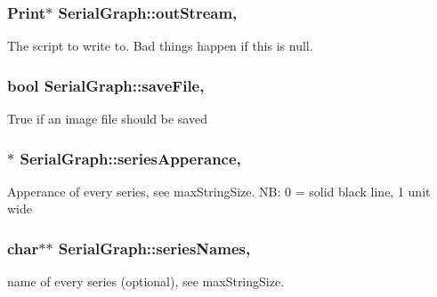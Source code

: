 \subsubsection[{out\+Stream}]{\setlength{\rightskip}{0pt plus 5cm}Print$\ast$ Serial\+Graph\+::out\+Stream\hspace{0.3cm}{\ttfamily [protected]}, {\ttfamily [inherited]}}\label{class_serial_graph_aec32289a9393e98bf80d44406e5c207d}
The script to write to. Bad things happen if this is null. \hypertarget{class_serial_graph_a24202e0a7a8bac5ec1cfd92bf796e078}{}
\subsubsection[{save\+File}]{\setlength{\rightskip}{0pt plus 5cm}bool Serial\+Graph\+::save\+File\hspace{0.3cm}{\ttfamily [protected]}, {\ttfamily [inherited]}}\label{class_serial_graph_a24202e0a7a8bac5ec1cfd92bf796e078}
True if an image file should be saved \hypertarget{class_serial_graph_a8d743f9eeeca69a988d2159a405e4253}{}
\subsubsection[{series\+Apperance}]{$\ast$ Serial\+Graph\+::series\+Apperance\hspace{0.3cm}{\ttfamily [protected]}, {\ttfamily [inherited]}}\label{class_serial_graph_a8d743f9eeeca69a988d2159a405e4253}
Apperance of every series, see max\+String\+Size. N\+B\+: 0 = solid black line, 1 unit wide \hypertarget{class_serial_graph_a2307e40e27249f44bbe14776dc68c561}{}
\subsubsection[{series\+Names}]{\setlength{\rightskip}{0pt plus 5cm}char$\ast$$\ast$ Serial\+Graph\+::series\+Names\hspace{0.3cm}{\ttfamily [protected]}, {\ttfamily [inherited]}}\label{class_serial_graph_a2307e40e27249f44bbe14776dc68c561}
name of every series (optional), see max\+String\+Size. \hypertarget{class_serial_graph_ad61d5ea29eacc1611c5addc94714f1e2}{}
